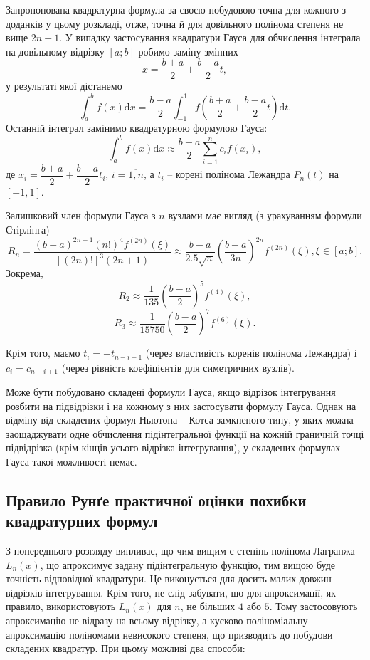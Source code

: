 \documentclass[14pt,twoside]{extreport}
\theoremstyle{mystyle}
\numberwithin{equation}{chapter}
\begin{document}
Запропонована квадратурна формула за своєю побудовою точна для кожного з доданків у цьому розкладі, отже, точна й для довільного полінома степеня не вище $2n - 1$.
У випадку застосування квадратури Гауса для обчислення інтеграла на довільному відрізку $[a; b]$ робимо заміну змінних
\[
x=\frac{b+a}{2}+\frac{b-a}{2} t,
\]
у результаті якої дістанемо
\[
\int_{a}^{b}f(x)\mathrm{d}x=\frac{b-a}{2}\int_{-1}^{1}f\left(\frac{b+a}{2}+\frac{b-a}{2}t\right)\mathrm{d}t.
\]
Останній інтеграл замінимо квадратурною формулою Гауса:
\[
\int_{a}^{b}f(x)\mathrm{d}x\approx\frac{b-a}{2}\sum_{i=1}^{n}c_{i}f(x_{i}),
\]
де $x_i=\dfrac{b+a}{2} + \dfrac{b-a}{2}t_i$, $i=\overline{1, n}$, а $t_i$ -- корені полінома Лежандра $P_n(t)$ на $[-1, 1]$.

Залишковий член формули Гауса з $n$ вузлами має вигляд (з урахуванням формули Стірлінга)
\[
R_{n}=\frac{(b-a)^{2n+1}(n!)^{4}f^{(2n)}(\xi)}{[(2n)!]^{3}(2n+1)}\approx\frac{b-a}{2.5\sqrt{n}}\left(\frac{b-a}{3n}\right)^{2n}f^{(2n)}(\xi), \xi\in[a; b].
\]
Зокрема,
\[
R_{2}\approx\frac{1}{135}\left(\frac{b-a}{2}\right)^{5}f^{(4)}(\xi),
\]
\[
R_{3}\approx\frac{1}{15750}\left(\frac{b-a}{2}\right)^{7}f^{(6)}(\xi).
\]

Крім того, маємо $t_i = -t_{n-i+1}$ (через властивість коренів полінома Лежандра) і $c_i = c_{n-i+1}$ (через рівність коефіцієнтів для симетричних вузлів).

Може бути побудовано складені формули Гауса, якщо відрізок інтегрування розбити на підвідрізки і на кожному з них застосувати формулу Гауса. Однак на відміну від складених формул Ньютона -- Котса замкненого типу, у яких можна заощаджувати одне обчислення підінтегральної функції на кожній граничній точці підвідрізка (крім кінців усього відрізка інтегрування), у складених формулах Гауса такої можливості немає.

\subsection{Правило Рунґе практичної оцінки похибки квадратурних формул}

З попереднього розгляду випливає, що чим вищим є степінь полінома Лагранжа $L_n(x)$, що апроксимує задану підінтегральную функцію, тим вищою буде точність відповідної квадратури. Це виконується для досить малих довжин відрізків інтегрування. Крім того, не слід забувати, що для апроксимації, як правило, використовують $L_n(x)$ для $n$, не більших $4$ або $5$. Тому застосовують апроксимацію не відразу на всьому відрізку, а кусково-поліноміальну апроксимацію поліномами невисокого степеня, що призводить до побудови складених квадратур. При цьому можливі два способи:
\end{document}

